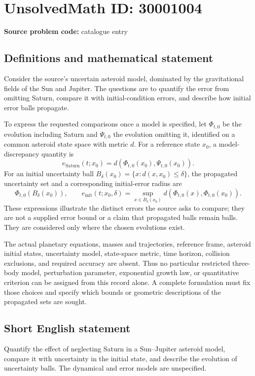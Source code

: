 \documentclass[11pt]{article}
\begin{document}
\section*{UnsolvedMath ID: 30001004}
\textbf{Source problem code:} catalogue entry
\subsection{Definitions and mathematical statement}
Consider the source's uncertain asteroid model, dominated by the gravitational fields of the Sun and Jupiter. The questions are to quantify the error from omitting Saturn, compare it with initial-condition errors, and describe how initial error balls propagate.

To express the requested comparisons once a model is specified, let \(\Phi_{t,0}\) be the evolution including Saturn and \(\Psi_{t,0}\) the evolution omitting it, identified on a common asteroid state space with metric \(d\). For a reference state \(x_0\), a model-discrepancy quantity is
\[
e_{\mathrm{Saturn}}(t;x_0)=d(\Phi_{t,0}(x_0),\Psi_{t,0}(x_0)).
\]
For an initial uncertainty ball \(B_\delta(x_0)=\{x:d(x,x_0)\leq\delta\}\), the propagated uncertainty set and a corresponding initial-error radius are
\[
\Phi_{t,0}(B_\delta(x_0)),\qquad
 e_{\mathrm{init}}(t;x_0,\delta)=
\sup_{x\in B_\delta(x_0)}d(\Phi_{t,0}(x),\Phi_{t,0}(x_0)).
\]
These expressions illustrate the distinct errors the source asks to compare; they are not a supplied error bound or a claim that propagated balls remain balls. They are considered only where the chosen evolutions exist.

The actual planetary equations, masses and trajectories, reference frame, asteroid initial states, uncertainty model, state-space metric, time horizon, collision exclusions, and required accuracy are absent. Thus no particular restricted three-body model, perturbation parameter, exponential growth law, or quantitative criterion can be assigned from this record alone. A complete formulation must fix those choices and specify which bounds or geometric descriptions of the propagated sets are sought.
\subsection{Short English statement}
Quantify the effect of neglecting Saturn in a Sun--Jupiter asteroid model, compare it with uncertainty in the initial state, and describe the evolution of uncertainty balls. The dynamical and error models are unspecified.
\end{document}
